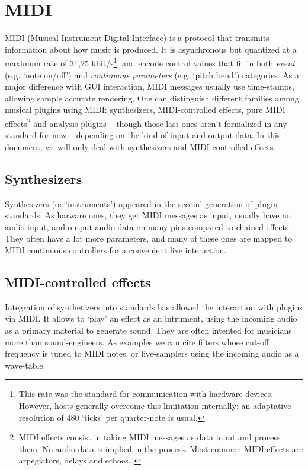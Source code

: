\section{MIDI}
\noindent MIDI (Musical Instrument Digital Interface) is a protocol that transmits information about how music is produced. It is asynchronous but quantized at a maximum rate of 31,25 kbit/s\footnote{This rate was the standard for communication with hardware devices. However, hosts generally overcome this limitation internally: an adaptative resolution of 480 `ticks' per quarter-note is usual.}, and encode control values that fit in both \textit{event} (e.g. `note on/off') and \textit{continuous parameters} (e.g. `pitch bend') categories. As a major difference with GUI interaction, MIDI messages usually use time-stamps, allowing sample accurate rendering. One can distinguish different families among musical plugins using MIDI: synthesizers, MIDI-controlled effects, pure MIDI effects\footnote{MIDI effects consist in taking MIDI messages as data input and process them. No audio data is implied in the process. Most common MIDI effects are arpegiators, delays and echoes\ldots} and analysis plugins -- though those last ones aren't formalized in any standard for now -- depending on the kind of input and output data. In this document, we will only deal with synthesizers and MIDI-controlled effects.\\

\subsection{Synthesizers}
\noindent Synthesizers (or `instruments') appeared in the second generation of plugin standards. As harware ones, they get MIDI messages as input, usually have no audio input, and output audio data on many pins compared to chained effects. They often have a lot more parameters, and many of these ones are mapped to MIDI continuous controllers for a convenient live interaction.

\subsection{MIDI-controlled effects}
\noindent Integration of synthetizers into standards has allowed the interaction with plugins via MIDI. It allows to `play' an effect as an intrument, using the incoming audio as a primary material to generate sound. They are often intented for musicians more than sound-engineers. As examples we can cite filters whose cut-off frequency is tuned to MIDI notes, or live-samplers using the incoming audio as a wave-table.
